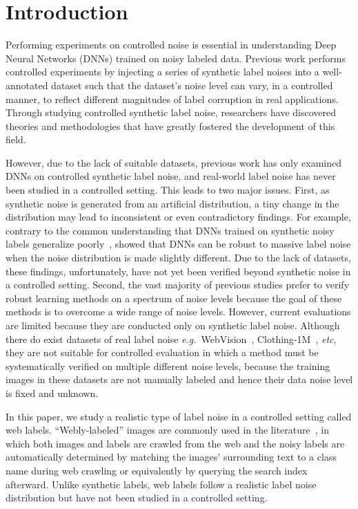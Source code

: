 \documentclass{article}
\newcommand{\eg}{\emph{e.g.}} \newcommand{\Eg}{\emph{E.g}}
\newcommand{\etc}{\emph{etc}}
\begin{document}
\section{Introduction}
Performing experiments on controlled noise is essential in understanding Deep Neural Networks (DNNs) trained on noisy labeled data. Previous work performs controlled experiments by injecting a series of synthetic label noises into a well-annotated dataset such that the dataset's noise level can vary, in a controlled manner, to reflect different magnitudes of label corruption in real applications. Through studying controlled synthetic label noise, researchers have discovered theories and methodologies that have greatly fostered the development of this field.

However, due to the lack of suitable datasets, previous work has only examined DNNs on controlled synthetic label noise, and real-world label noise has never been studied in a controlled setting. This leads to two major issues. First, as synthetic noise is generated from an artificial distribution, a tiny change in the distribution may lead to inconsistent or even contradictory findings. For example, contrary to the common understanding that DNNs trained on synthetic noisy labels generalize poorly~\citep{zhang2017understanding}, \citet{rolnick2017deep} showed that DNNs can be robust to massive label noise when the noise distribution is made slightly different. Due to the lack of datasets, these findings, unfortunately, have not yet been verified beyond synthetic noise in a controlled setting. Second, the vast majority of previous studies prefer to verify robust learning methods on a spectrum of noise levels because the goal of these methods is to overcome a wide range of noise levels. However, current evaluations are limited because they are conducted only on synthetic label noise.
Although there do exist datasets of real label noise \eg~WebVision~\citep{li2017webvision}, Clothing-1M~\citep{xiao2015learning}, \etc, they are not suitable for controlled evaluation in which a method must be systematically verified on multiple different noise levels, because the training images in these datasets are not manually labeled and hence their data noise level is fixed and unknown.

In this paper, we study a realistic type of label noise in a controlled setting called web labels. ``Webly-labeled'' images are commonly used in the literature~\cite{bootkrajang2012label,li2017webvision,krause2016unreasonable,chen2015webly}, in which both images and labels are crawled from the web and the noisy labels are automatically determined by matching the images' surrounding text to a class name during web crawling or equivalently by querying the search index afterward. Unlike synthetic labels, web labels follow a realistic label noise distribution but have not been studied in a controlled setting.
\end{document}
